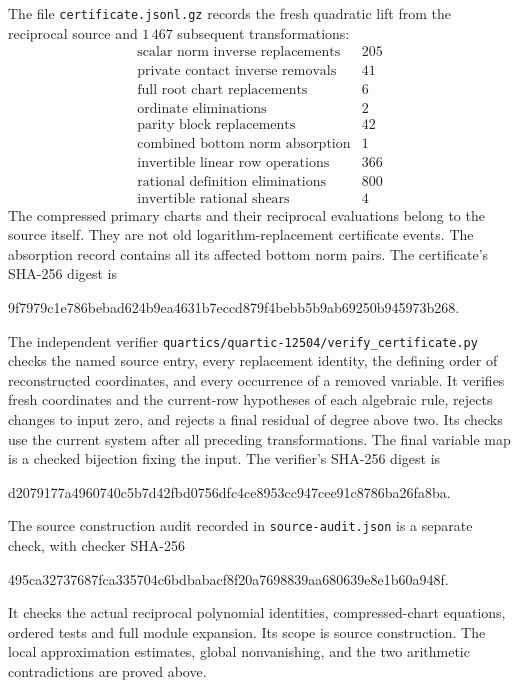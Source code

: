 \documentclass[11pt]{article}
\theoremstyle{definition}
\theoremstyle{remark}
\begin{document}
The file \nolinkurl{certificate.jsonl.gz} records the fresh quadratic
lift from the reciprocal source and $1\,467$ subsequent transformations:
\[
\begin{array}{lr}
\text{scalar norm inverse replacements}&205\\
\text{private contact inverse removals}&41\\
\text{full root chart replacements}&6\\
\text{ordinate eliminations}&2\\
\text{parity block replacements}&42\\
\text{combined bottom norm absorption}&1\\
\text{invertible linear row operations}&366\\
\text{rational definition eliminations}&800\\
\text{invertible rational shears}&4
\end{array}
\]
The compressed primary charts and their reciprocal evaluations belong to
the source itself. They are not old logarithm-replacement certificate events.
The absorption record contains all its affected bottom norm pairs.
The certificate's SHA-256 digest is
\begin{center}\footnotesize\ttfamily
9f7979c1e786bebad624b9ea4631b7eccd879f4bebb5b9ab69250b945973b268.
\end{center}

The independent verifier
\nolinkurl{quartics/quartic-12504/verify_certificate.py}
checks the named source entry, every replacement identity, the defining
order of reconstructed coordinates, and every occurrence of a removed
variable. It verifies fresh coordinates and the current-row hypotheses of
each algebraic rule, rejects changes to input zero, and rejects a final
residual of degree above two. Its checks use the current system after all
preceding transformations. The final variable map is a checked bijection
fixing the input. The verifier's SHA-256 digest is
\begin{center}\footnotesize\ttfamily
d2079177a4960740c5b7d42fbd0756dfc4ce8953cc947cee91c8786ba26fa8ba.
\end{center}

The source construction audit recorded in \nolinkurl{source-audit.json}
is a separate check, with checker SHA-256
\begin{center}\footnotesize\ttfamily
495ca32737687fca335704c6bdbabacf8f20a7698839aa680639e8e1b60a948f.
\end{center}
It checks the actual reciprocal polynomial identities, compressed-chart
equations, ordered tests and full module expansion. Its scope is source
construction. The local approximation estimates, global nonvanishing,
and the two arithmetic contradictions are proved above.
\end{document}
